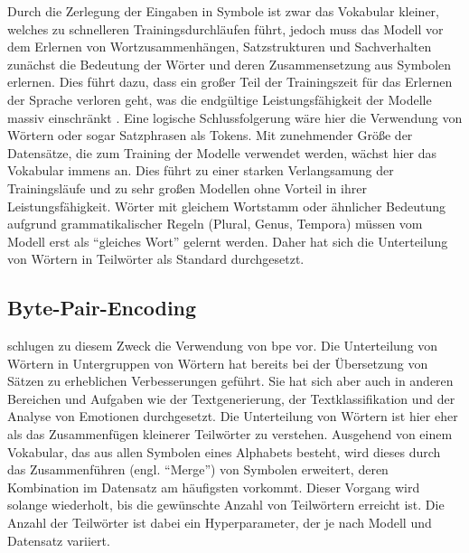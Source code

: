 Durch die Zerlegung der Eingaben in Symbole ist zwar das Vokabular kleiner, welches zu schnelleren Trainingsdurchläufen führt, jedoch muss das Modell vor dem Erlernen von Wortzusammenhängen, Satzstrukturen und Sachverhalten zunächst die Bedeutung der Wörter und deren Zusammensetzung aus Symbolen erlernen.
Dies führt dazu, dass ein großer Teil der Trainingszeit für das Erlernen der Sprache verloren geht, was die endgültige Leistungsfähigkeit der Modelle massiv einschränkt \citep{bpe}.
Eine logische Schlussfolgerung wäre hier die Verwendung von Wörtern oder sogar Satzphrasen als Tokens.
Mit zunehmender Größe der Datensätze, die zum Training der Modelle verwendet werden, wächst hier das Vokabular immens an.
Dies führt zu einer starken Verlangsamung der Trainingsläufe und zu sehr großen Modellen ohne Vorteil in ihrer Leistungsfähigkeit.
Wörter mit gleichem Wortstamm oder ähnlicher Bedeutung aufgrund grammatikalischer Regeln (Plural, Genus, Tempora) müssen vom Modell erst als \enquote{gleiches Wort} gelernt werden.
Daher hat sich die Unterteilung von Wörtern in Teilwörter als Standard durchgesetzt.

\subsection{Byte-Pair-Encoding}\label{subsec:bpe}
\citet{bpe} schlugen zu diesem Zweck die Verwendung von \ac{bpe} vor.
Die Unterteilung von Wörtern in Untergruppen von Wörtern hat bereits bei der Übersetzung von Sätzen zu erheblichen Verbesserungen geführt.
Sie hat sich aber auch in anderen Bereichen und Aufgaben wie der Textgenerierung, der Textklassifikation und der Analyse von Emotionen durchgesetzt.
Die Unterteilung von Wörtern ist hier eher als das Zusammenfügen kleinerer Teilwörter zu verstehen.
Ausgehend von einem Vokabular, das aus allen Symbolen eines Alphabets besteht, wird dieses durch das Zusammenführen (engl.
\enquote{Merge}) von Symbolen erweitert, deren Kombination im Datensatz am häufigsten vorkommt.
Dieser Vorgang wird solange wiederholt, bis die gewünschte Anzahl von Teilwörtern erreicht ist.
Die Anzahl der Teilwörter ist dabei ein Hyperparameter, der je nach Modell und Datensatz variiert.\\

